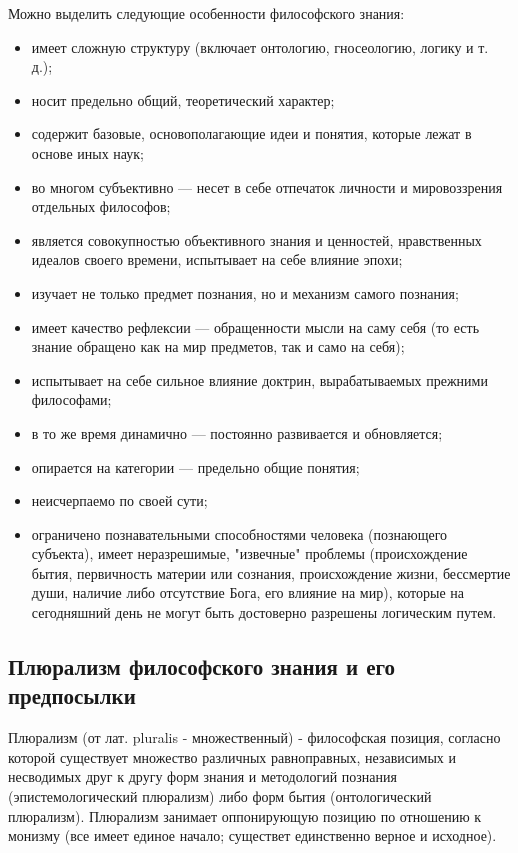 \documentclass[12pt]{article}
\begin{document}
Можно выделить следующие особенности философского знания:
\begin{itemize}
\item имеет сложную структуру (включает онтологию, гносеологию, логику и т. д.);
\item носит предельно общий, теоретический характер;
\item содержит базовые, основополагающие идеи и понятия, которые лежат в основе иных наук;
\item во многом субъективно — несет в себе отпечаток личности и мировоззрения отдельных философов;
\item является совокупностью объективного знания и ценностей, нравственных идеалов своего времени,
	испытывает на себе влияние эпохи;
\item изучает не только предмет познания, но и механизм самого познания;
\item имеет качество рефлексии — обращенности мысли на саму себя (то есть знание обращено как на мир
	предметов, так и само на себя);
\item испытывает на себе сильное влияние доктрин, вырабатываемых прежними философами;
\item в то же время динамично — постоянно развивается и обновляется;
\item опирается на категории — предельно общие понятия;
\item неисчерпаемо по своей сути;
\item ограничено познавательными способностями человека (познающего субъекта), имеет неразрешимые,
	"извечные" проблемы (происхождение бытия, первичность материи или сознания, происхождение жизни,
	бессмертие души, наличие либо отсутствие Бога, его влияние на мир), которые на сегодняшний день не могут
	быть достоверно разрешены логическим путем.
\end{itemize}

\subsection{Плюрализм философского знания и его предпосылки}
Плюрализм (от лат. pluralis - множественный) - философская позиция, согласно которой существует множество
различных равноправных, независимых и несводимых друг к другу форм знания и методологий познания
(эпистемологический плюрализм) либо форм бытия (онтологический плюрализм). Плюрализм занимает
оппонирующую позицию по отношению к монизму (все имеет единое начало; существет единственно верное и исходное).
\end{document}
